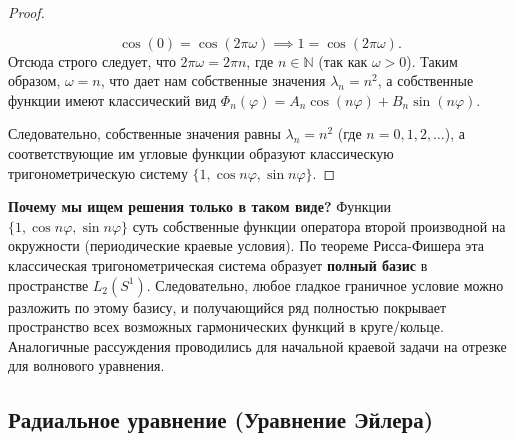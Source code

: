 \documentclass[a4paper,10pt]{article}
\begin{document}
\begin{proof}
\begin{enumerate}
    \[ \cos(0) = \cos(2\pi\omega) \implies 1 = \cos(2\pi\omega). \]
    Отсюда строго следует, что $2\pi\omega = 2\pi n$, где $n \in \mathbb{N}$ (так как $\omega > 0$). Таким образом, $\omega = n$, что дает нам собственные значения $\lambda_n = n^2$, а собственные функции имеют классический вид $\Phi_n(\varphi) = A_n \cos(n\varphi) + B_n \sin(n\varphi)$.
\end{enumerate}
Следовательно, собственные значения равны $\lambda_n = n^2$ (где $n = 0, 1, 2, \dots$), а соответствующие им угловые функции образуют классическую тригонометрическую систему $\{1, \cos n\varphi, \sin n\varphi\}$.
\end{proof}

\textbf{Почему мы ищем решения только в таком виде?}
Функции $\{1, \cos n\varphi, \sin n\varphi\}$ суть собственные функции оператора второй производной на окружности (периодические краевые условия). По теореме Рисса-Фишера эта классическая тригонометрическая система образует \textbf{полный базис} в пространстве $L_2(S^1)$. Следовательно, любое гладкое граничное условие можно разложить по этому базису, и получающийся ряд полностью покрывает пространство всех возможных гармонических функций в круге/кольце. Аналогичные рассуждения проводились для начальной краевой задачи на отрезке для волнового уравнения.

\subsection*{Радиальное уравнение (Уравнение Эйлера)}
\end{document}

